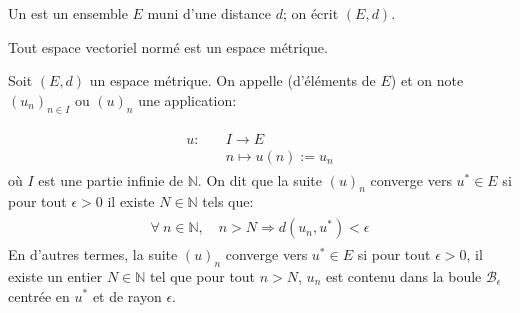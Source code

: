 \documentclass[letterpaper,11pt,english]{sphinxmanual}
\begin{document}
\begin{DUlineblock}{0em}
\item[]  Un  est un ensemble \(E\) muni
d’une distance \(d\); on écrit \((E, d)\).
\item[]  Tout espace vectoriel normé est un espace métrique.
\item[] 
\item[] Soit \((E,d)\) un espace métrique. On appelle 
(d’éléments de \(E\)) et on note \((u_n)_{n\in I}\) ou
\((u)_n\) une application:
\end{DUlineblock}
\begin{equation}\label{equation:chapter2:chapter2:23}
\begin{split}\begin{aligned}
    u: \quad& I \rightarrow E\\
    & n \mapsto u(n):=u_n\end{aligned}\end{split}
\end{equation}
\sphinxAtStartPar
où \(I\) est une partie infinie de \(\mathbb{N}\). On dit que
la suite \((u)_n\) converge vers \(u^*\in E\) si pour tout
\(\epsilon>0\) il existe \(N \in \mathbb{N}\) tels que:
\begin{equation}\label{equation:chapter2:chapter2:24}
\begin{split}\begin{aligned}
    \forall\  n\in \mathbb{N}, \quad n>N \Longrightarrow d(u_n, u^*) < \epsilon\end{aligned}\end{split}
\end{equation}
\sphinxAtStartPar
En d’autres termes, la suite \((u)_n\) converge vers
\(u^*\in E\) si pour tout \(\epsilon>0\), il existe un entier
\(N\in \mathbb{N}\) tel que pour tout \(n>N\), \(u_n\) est
contenu dans la boule \(\mathcal{B}_{\epsilon}\) centrée en
\(u^*\) et de rayon \(\epsilon\).
\end{document}

